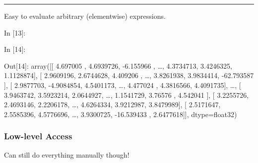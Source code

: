     \begin{center}\rule{0.5\linewidth}{\linethickness}\end{center}

    Easy to evaluate arbitrary (elementwise) expressions.

    \begin{BGVerbatim}[commandchars=\\\{\}]
{\color{incolor}In [{\color{incolor}13}]:}  
\end{BGVerbatim}

    \begin{BGVerbatim}[commandchars=\\\{\}]
{\color{incolor}In [{\color{incolor}14}]:}     
\end{BGVerbatim}

\begin{BGVerbatim}[commandchars=\\\{\}]
{\color{outcolor}Out[{\color{outcolor}14}]:} array([[  4.697005 ,   4.6939726,  -6.155966 , {\ldots},   4.3734713,
                   3.4246325,   1.1128874],
                [  2.9609196,   2.6744628,   4.409206 , {\ldots},   3.8261938,
                   3.9834414, -62.793587 ],
                [  2.9877703,  -4.9084854,   4.5401173, {\ldots},   4.477024 ,
                   4.3816566,   4.4091735],
                {\ldots},
                [  3.9463742,   3.5923214,   2.0644927, {\ldots},   1.1541729,
                   3.76576  ,   4.542041 ],
                [  3.2255726,   2.4693146,   2.2206178, {\ldots},   4.6264334,
                   3.9212987,   3.8479989],
                [  2.5171647,   2.5585396,   4.5776696, {\ldots},   3.9300725,
                 -16.539433 ,   2.6477618]], dtype=float32)
\end{BGVerbatim}
            
    \hypertarget{low-level-access}{%
\subsubsection{Low-level Access}\label{low-level-access}}

Can still do everything manually though!

